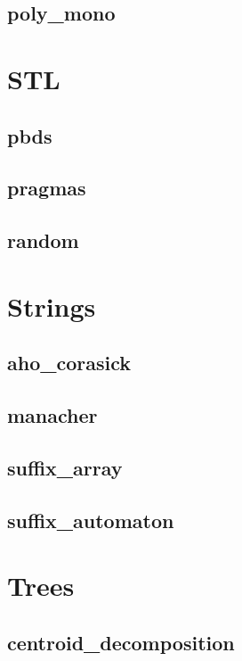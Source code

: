 \documentclass[a4paper, twocolumn]{article}
\begin{document}
\subsection{poly\_mono}

\section{STL}
\subsection{pbds}

\subsection{pragmas}

\subsection{random}

\section{Strings}
\subsection{aho\_corasick}

\subsection{manacher}

\subsection{suffix\_array}

\subsection{suffix\_automaton}

\section{Trees}
\subsection{centroid\_decomposition}

\end{document}
